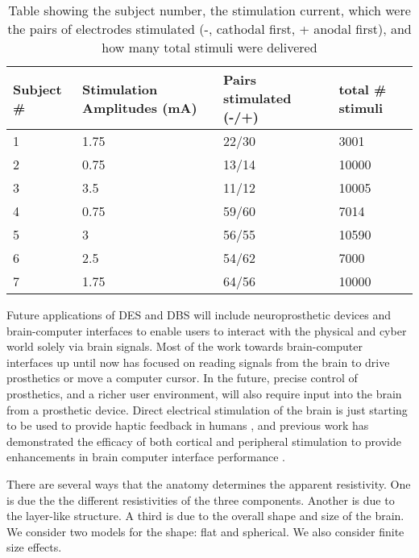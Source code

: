 \renewcommand{\tabcolsep}{1pt}
\renewcommand{\arraystretch}{0.7}
\begin{table}[ht]

	\begin{tabularx}{\textwidth}{@{}lXXX@{}}
		\toprule
		Subject \# & Stimulation Amplitudes (mA) & Pairs stimulated \newline (-/+) & total \# stimuli \\
		\midrule
		1  & 1.75 & 22/30 & 3001 \\
		2  & 0.75 & 13/14 & 10000 \\
		3  & 3.5 & 11/12 & 10005 \\
		4 & 0.75 & 59/60 & 7014 \\
		5 & 3 & 56/55 & 10590 \\
		6  & 2.5  & 54/62 & 7000 \\
		7  & 1.75  & 64/56 & 10000\\
		\bottomrule		
	\end{tabularx}
	\caption[Subject characteristics]{Table showing the subject number, the stimulation current, which were the pairs of electrodes stimulated (-, cathodal first, + anodal first), and how many total stimuli were delivered}
	\label{table:mrSubjs}
\end{table}



Future applications of DES and DBS will include neuroprosthetic devices and brain-computer interfaces to enable users to interact with the physical and cyber world solely via brain signals. Most of the work towards brain-computer interfaces up until now has focused on reading signals from the brain to drive prosthetics or move a computer cursor.  In the future, precise control of prosthetics, and a richer user environment, will also require input into the brain from a prosthetic device. Direct electrical stimulation of the brain is just starting to be used to provide haptic feedback in humans \cite{Cronin2016a,Collins2016}, and previous work has demonstrated the efficacy of both cortical and peripheral stimulation to provide enhancements in brain computer interface performance \cite{Klaes2014,Dadarlat2015}.

There are several ways that the anatomy determines the apparent resistivity.
One is due the the different resistivities of the three components.
Another is due to the layer-like structure.
A third is due to the overall shape and size of the brain.
We consider two models for the shape: flat and spherical.
We also consider finite size effects.



